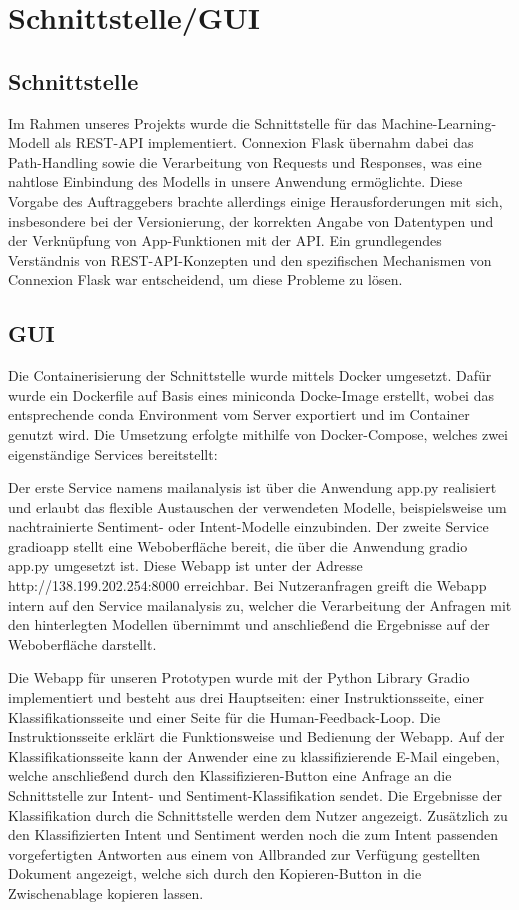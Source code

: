 \section{Schnittstelle/GUI}

\subsection{Schnittstelle}

Im Rahmen unseres Projekts wurde die Schnittstelle für das Machine-Learning-Modell als REST-API implementiert.
Connexion Flask übernahm dabei das Path-Handling sowie die Verarbeitung von Requests und Responses, was eine
nahtlose Einbindung des Modells in unsere Anwendung ermöglichte. Diese Vorgabe des Auftraggebers brachte
allerdings einige Herausforderungen mit sich, insbesondere bei der Versionierung, der korrekten Angabe
von Datentypen und der Verknüpfung von App-Funktionen mit der API. Ein grundlegendes Verständnis von
REST-API-Konzepten und den spezifischen Mechanismen von Connexion Flask war entscheidend, um diese Probleme
zu lösen. 

\subsection{GUI}

Die Containerisierung der Schnittstelle wurde mittels Docker umgesetzt. Dafür wurde ein
Dockerfile auf Basis eines miniconda Docke-Image erstellt, wobei das entsprechende conda
Environment vom Server exportiert und im Container genutzt wird. Die Umsetzung erfolgte mithilfe
von Docker-Compose, welches zwei eigenständige Services bereitstellt: 

Der erste Service namens mailanalysis ist über die Anwendung app.py realisiert und erlaubt
das flexible Austauschen der verwendeten Modelle, beispielsweise um nachtrainierte Sentiment-
oder Intent-Modelle einzubinden. Der zweite Service gradioapp stellt eine Weboberfläche bereit,
die über die Anwendung gradio app.py umgesetzt ist. Diese Webapp ist unter der
Adresse http://138.199.202.254:8000 erreichbar. Bei Nutzeranfragen greift die Webapp intern
auf den Service mailanalysis zu, welcher die Verarbeitung der Anfragen mit den hinterlegten
Modellen übernimmt und anschließend die Ergebnisse auf der Weboberfläche darstellt. 

Die Webapp für unseren Prototypen wurde mit der Python Library Gradio implementiert und besteht
aus drei Hauptseiten: einer Instruktionsseite, einer Klassifikationsseite und einer Seite für
die Human-Feedback-Loop. Die Instruktionsseite erklärt die Funktionsweise und Bedienung
der Webapp. Auf der Klassifikationsseite kann der Anwender eine zu klassifizierende E-Mail
eingeben, welche anschließend durch den Klassifizieren-Button eine Anfrage an die Schnittstelle
zur Intent- und Sentiment-Klassifikation sendet. Die Ergebnisse der Klassifikation durch die
Schnittstelle werden dem Nutzer angezeigt. Zusätzlich zu den Klassifizierten Intent und Sentiment
werden noch die zum Intent passenden vorgefertigten Antworten aus einem von Allbranded zur
Verfügung gestellten Dokument angezeigt, welche sich durch den Kopieren-Button in die
Zwischenablage kopieren lassen.  

